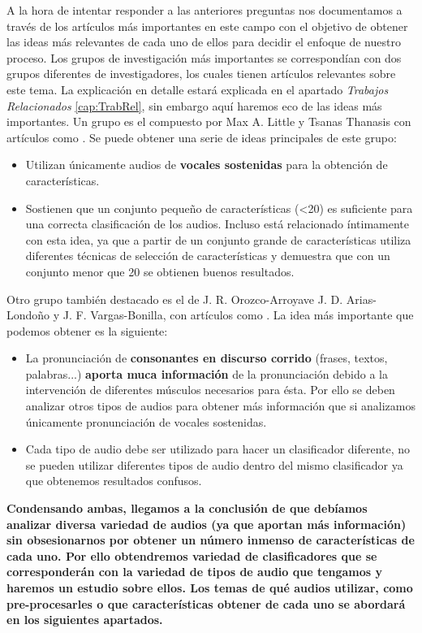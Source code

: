 A la hora de intentar responder a las anteriores preguntas nos documentamos a través de los artículos más importantes en este campo con el objetivo de obtener las ideas más relevantes de cada uno de ellos para decidir el enfoque de nuestro proceso. Los grupos de investigación más importantes se correspondían con dos grupos diferentes de investigadores, los cuales tienen artículos relevantes sobre este tema. La explicación en detalle estará explicada en el apartado \textit{Trabajos Relacionados} \ref{cap:TrabRel}, sin embargo aquí haremos eco de las ideas más importantes.
Un grupo es el compuesto por Max A. Little y Tsanas Thanasis con artículos como \cite{MxLtSuitability}. Se puede obtener una serie de ideas principales de este grupo:
\begin{itemize}
\item Utilizan únicamente audios de \textbf{vocales sostenidas} para la obtención de características.
\item Sostienen que un conjunto pequeño de características (<20) es suficiente para una correcta clasificación de los audios. Incluso \cite{MxLtNovel} está relacionado íntimamente con esta idea, ya que a partir de un conjunto grande de características utiliza diferentes técnicas de selección de características y demuestra que con un conjunto menor que 20 se obtienen buenos resultados.
\end{itemize}

Otro grupo también destacado es el de J. R. Orozco-Arroyave J. D. Arias-Londoño y J. F. Vargas-Bonilla, con artículos como \cite{Orz2016}. La idea más importante que podemos obtener es la siguiente:
\begin{itemize}
\item La pronunciación de \textbf{consonantes en discurso corrido} (frases, textos, palabras...) \textbf{aporta muca información} de la pronunciación debido a la intervención de diferentes músculos necesarios para ésta. Por ello se deben analizar otros tipos de audios para obtener más información que si analizamos únicamente pronunciación de vocales sostenidas.
\item Cada tipo de audio debe ser utilizado para hacer un clasificador diferente, no se pueden utilizar diferentes tipos de audio dentro del mismo clasificador ya que obtenemos resultados confusos.
\end{itemize}

\textbf{Condensando ambas, llegamos a la conclusión de que debíamos analizar diversa variedad de audios (ya que aportan más información) sin obsesionarnos por obtener un número inmenso de características de cada uno. Por ello obtendremos variedad de clasificadores que se corresponderán con la variedad de tipos de audio que tengamos y haremos un estudio sobre ellos. Los temas de qué audios utilizar, como pre-procesarles o que características obtener de cada uno se abordará en los siguientes apartados.}

